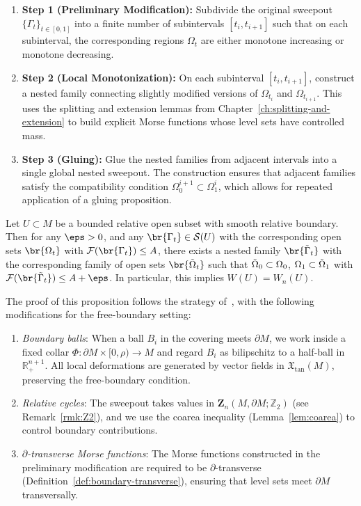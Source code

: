 \begin{enumerate}
\item \textbf{Step 1 (Preliminary Modification):} Subdivide the original sweepout $\{\Gamma_t\}_{t\in[0,1]}$
into a finite number of subintervals $[t_i, t_{i+1}]$ such that on each subinterval, the corresponding
regions $\Omega_t$ are either monotone increasing or monotone decreasing.

\item \textbf{Step 2 (Local Monotonization):} On each subinterval $[t_i, t_{i+1}]$, construct a nested
family connecting slightly modified versions of $\Omega_{t_i}$ and $\Omega_{t_{i+1}}$. This uses the
splitting and extension lemmas from Chapter~\ref{ch:splitting-and-extension} to build explicit Morse
functions whose level sets have controlled mass.

\item \textbf{Step 3 (Gluing):} Glue the nested families from adjacent intervals into a single global
nested sweepout. The construction ensures that adjacent families satisfy the compatibility condition
$\Omega_0^{i+1} \subset \Omega_1^i$, which allows for repeated application of a gluing proposition.
\end{enumerate}
\begin{proposition}\label{prop:nested-sweepout}
    Let $U \subset M$ be a bounded relative open subset with smooth relative boundary. Then for any $\eps > 0$, and any $\br{\Gamma_t} \in \mathcal{S}(U)$ with the corresponding open sets $\br{\Omega_t}$ with $\mathcal{F}(\br{\Gamma_t}) \leq A$, there exists a nested family $\br{\Tilde{\Gamma}_t}$ with the corresponding family of open sets $\br{\Tilde{\Omega}_t}$ such that $\Tilde{\Omega}_0 \subset \Omega_0$, $\Omega_1 \subset \Tilde{\Omega}_1$ with $\mathcal{F}(\br{\Tilde{\Gamma}_t}) \leq A + \eps$. In particular, this implies $W(U) = W_n(U)$.
\end{proposition}
The proof of this proposition follows the strategy of~\cite[Lemma 6.2]{CL20}, with the following modifications for the free-boundary setting:
\begin{enumerate}[label=\textup{(\roman*)}]
    \item \emph{Boundary balls}: When a ball $B_i$ in the covering meets $\partial M$, we work inside a fixed collar $\Phi: \partial M \times [0, \rho) \to M$ and regard $B_i$ as bilipschitz to a half-ball in $\mathbb{R}^{n+1}_+$. All local deformations are generated by vector fields in $\mathfrak{X}_{\mathrm{tan}}(M)$, preserving the free-boundary condition.
    \item \emph{Relative cycles}: The sweepout takes values in $\mathbf{Z}_n(M, \partial M;\mathbb{Z}_2)$ (see Remark~\ref{rmk:Z2}), and we use the coarea inequality (Lemma~\ref{lem:coarea}) to control boundary contributions.
    \item \emph{$\partial$-transverse Morse functions}: The Morse functions constructed in the preliminary modification are required to be $\partial$-transverse (Definition~\ref{def:boundary-transverse}), ensuring that level sets meet $\partial M$ transversally.
\end{enumerate}


